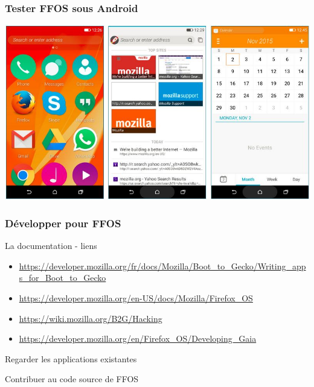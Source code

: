 \documentclass{beamer}
\begin{document}
\begin{frame}
\frametitle{Tester FFOS sous Android}

\begin{center}
\includegraphics[scale=0.7]{./images/FFOS_Android.jpg}
\end{center}
\end{frame}

\begin{frame}
\frametitle{Développer pour FFOS}

\begin{block}{La documentation - liens}
\begin{itemize}
\item \url{https://developer.mozilla.org/fr/docs/Mozilla/Boot_to_Gecko/Writing_apps_for_Boot_to_Gecko}
\item \url{https://developer.mozilla.org/en-US/docs/Mozilla/Firefox_OS}
\item \url{https://wiki.mozilla.org/B2G/Hacking}
\item \url{https://developer.mozilla.org/en/Firefox_OS/Developing_Gaia}
\end{itemize}
\end{block}

\begin{block}{Regarder les applications existantes}
\end{block}

\begin{block}{Contribuer au code source de FFOS}
\end{block}
\end{frame}
\end{document}

